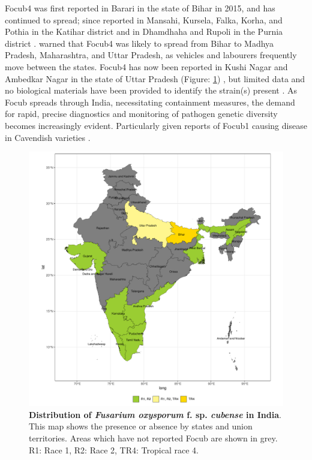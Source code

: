 \Ac{Focub4} was first reported in Barari in the state of Bihar in 2015, and has continued to spread; since reported in Mansahi, Kursela, Falka, Korha, and Pothia in the Katihar district and in Dhamdhaha and Rupoli in the Purnia district \parencite{Thangavelu2019}. \textcite{Viljoen2020} warned that \ac{Focub4} was likely to spread from Bihar to Madhya Pradesh, Maharashtra, and Uttar Pradesh, as vehicles and labourers frequently move between the states. \ac{Focub4} has now been reported in Kushi Nagar and Ambedkar Nagar in the state of Uttar Pradesh (Figure: \ref{fig:FocDisIndia}) \parencite{Damodaran2019, Thangavelu2019}, but limited data and no biological materials have been provided to identify the strain(s) present \parencite{Kema2021}. As \ac{Focub} spreads through India, necessitating containment measures, the demand for rapid, precise diagnostics and monitoring of pathogen genetic diversity becomes increasingly evident. Particularly given reports of \ac{Focub1} causing disease in Cavendish varieties \parencite{Thangavelu2020}.

\begin{figure}[hp!]
  \includegraphics[width=15cm]{Figures/FocDis_India.pdf}
  \caption[Distribution of \textit{Fusarium oxysporum} f. sp. \textit{cubense} in India]{\textbf{ Distribution of \textit{Fusarium oxysporum} f. sp. \textit{cubense} in India}. This map shows the presence or absence by states and union territories. Areas which have not reported \ac{Focub} are shown in grey. R1: Race 1, R2: Race 2, TR4: Tropical race 4.}
  \label{fig:FocDisIndia}
\end{figure}

